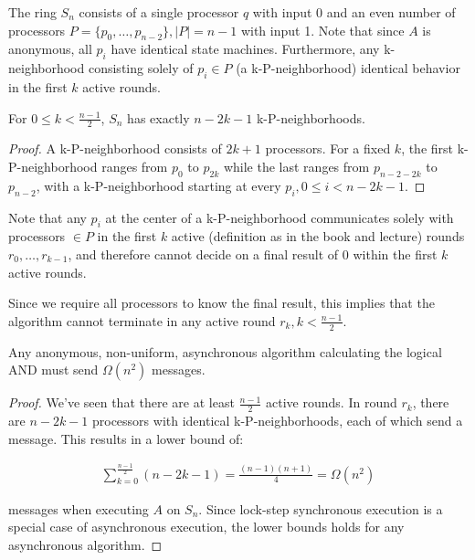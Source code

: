 The ring $S_n$ consists of a single processor $q$ with input 0 and an even number of processors 
$P = \{ p_0, \ldots, p_{n-2} \}, |P| = n - 1$ with input 1. Note that since $A$ is anonymous, all $p_i$
have identical state machines. Furthermore, any k-neighborhood consisting solely
of $p_i \in P$ (a k-P-neighborhood) identical behavior in the first $k$ active rounds.

\begin{lemma} \label{lemma:nrkpneighborhoods}
For $0 \leq k < \frac{n-1}{2}$, $S_n$ has exactly $n-2k-1$ k-P-neighborhoods.
\end{lemma}

\begin{proof}
A k-P-neighborhood consists of $2k + 1$ processors. For a fixed $k$, the first
k-P-neighborhood ranges from $p_0$ to $p_{2k}$ while the last ranges from $p_{n-2-2k}$
to $p_{n-2}$, with a k-P-neighborhood starting at every $p_i, 0 \leq i < n - 2k - 1$.
\end{proof}

Note that any $p_i$ at the center of a k-P-neighborhood communicates solely with
processors $\in P$ in the first $k$ active (definition as in the book and lecture)
rounds $r_0, \ldots, r_{k-1}$, and therefore cannot decide on a final result of $0$ within the first $k$
active rounds.

Since we require all processors to know the final result, this implies that the
algorithm cannot terminate in any active round $r_k, k < \frac{n-1}{2}$.


\begin{theorem}
Any anonymous, non-uniform, asynchronous algorithm calculating the logical AND
must send $\Omega(n^2)$ messages.
\end{theorem}

\begin{proof}
We've seen that there are at least $\frac{n-1}{2}$ active rounds. In round $r_k$,
there are $n-2k-1$ processors with identical k-P-neighborhoods, each of which
send a message. This results in a lower bound of:

\begin{align}
\sum_{k = 0}^{\frac{n-1}{2}} (n-2k-1) = \frac{(n-1)(n+1)}{4} = \Omega(n^2)
\end{align}

messages when executing $A$ on $S_n$. Since lock-step synchronous execution
is a special case of asynchronous execution, the lower bounds holds for
any asynchronous algorithm.
\end{proof}


